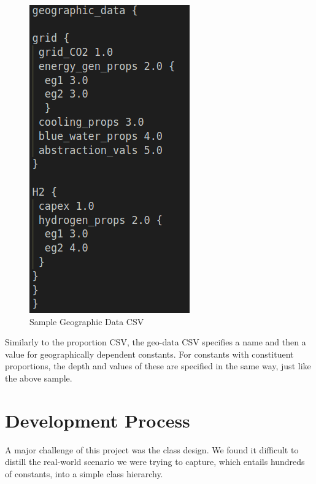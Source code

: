 \documentclass{article}
\begin{document}
\begin{figure}[H]
    \centering
    \includegraphics[scale=0.4]{figures/sample_geo.png}
    \caption{Sample Geographic Data CSV}
    \label{fig:Sample Proportion CSV}
\end{figure}

Similarly to the proportion CSV, the geo-data CSV specifies a name and then a value for geographically dependent constants. For constants with constituent proportions, the depth and values of these are specified in the same way, just like the above sample.

\section*{Development Process}
A major challenge of this project was the class design. We found it difficult to distill the real-world scenario we were trying to capture, which entails hundreds of constants, into a simple class hierarchy.
\end{document}
